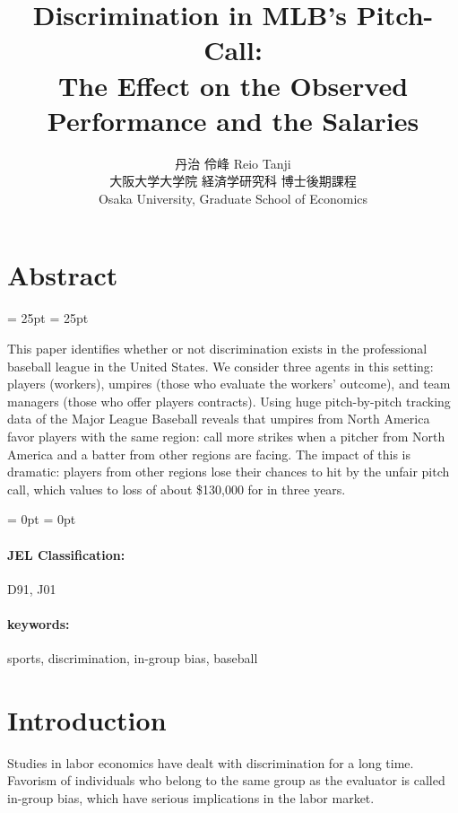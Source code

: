 \documentclass[dvipdfmx, 12pt]{jsarticle}
\begin{document}
\title{Discrimination in MLB's Pitch-Call: \\
The Effect on the Observed Performance and the Salaries}
\author{丹治 伶峰 Reio Tanji \\
大阪大学大学院 経済学研究科 博士後期課程 \\
Osaka University, Graduate School of Economics}
\date{}
\maketitle

\section*{Abstract}

\leftskip = 25pt
\rightskip = 25pt

This paper identifies whether or not discrimination exists in the professional baseball league in the United States. We consider three agents in this setting: players (workers), umpires (those who evaluate the workers' outcome), and team managers (those who offer players contracts). Using huge pitch-by-pitch tracking data of the Major League Baseball reveals that umpires from North America favor players with the same region: call more strikes when a pitcher from North America and a batter from other regions are facing. The impact of this is dramatic: players from other regions lose their chances to hit by the unfair pitch call, which values to loss of about \$130,000 for in three years.

\leftskip = 0pt
\rightskip = 0pt

\medskip

\noindent
\small

\paragraph{JEL Classification:}D91, J01
\paragraph{keywords:}sports, discrimination, in-group bias, baseball

\noindent

\normalsize

\section{Introduction}

Studies in labor economics have dealt with discrimination for a long time. Favorism of individuals who belong to the same group as the evaluator is called in-group bias, which have serious implications in the labor market.
\end{document}
